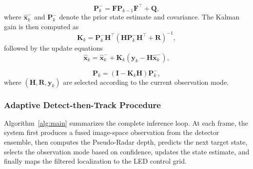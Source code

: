 \documentclass[pdflatex,sn-mathphys-num]{sn-jnl}%
\theoremstyle{thmstyleone}%
\theoremstyle{thmstyletwo}%
\theoremstyle{thmstylethree}%
\begin{document}
\begin{equation}
\mathbf{P}_{k}^{-} = \mathbf{F}\mathbf{P}_{k-1}\mathbf{F}^{\top} + \mathbf{Q},
\label{eq:kf_pred_p}
\end{equation}
where $\hat{\mathbf{x}}_{k}^{-}$ and $\mathbf{P}_{k}^{-}$ denote the prior state estimate and covariance.
The Kalman gain is then computed as
\begin{equation}
\mathbf{K}_k = \mathbf{P}_{k}^{-}\mathbf{H}^{\top} \left(\mathbf{H}\mathbf{P}_{k}^{-}\mathbf{H}^{\top} + \mathbf{R}\right)^{-1},
\label{eq:kf_gain}
\end{equation}
followed by the update equations
\begin{equation}
\hat{\mathbf{x}}_k = \hat{\mathbf{x}}_{k}^{-} + \mathbf{K}_k\left(\mathbf{y}_k - \mathbf{H}\hat{\mathbf{x}}_{k}^{-}\right),
\label{eq:kf_update_x}
\end{equation}

\begin{equation}
\mathbf{P}_k = \left(\mathbf{I} - \mathbf{K}_k\mathbf{H}\right)\mathbf{P}_{k}^{-},
\label{eq:kf_update_p}
\end{equation}
where $(\mathbf{H}, \mathbf{R}, \mathbf{y}_k)$ are selected according to the current observation mode.

\subsubsection{Adaptive Detect-then-Track Procedure}

Algorithm~\ref{alg:main} summarizes the complete inference loop. At each frame, the system first produces a fused image-space observation from the detector ensemble, then computes the Pseudo-Radar depth, predicts the next target state, selects the observation mode based on confidence, updates the state estimate, and finally maps the filtered localization to the LED control grid.
\end{document}
